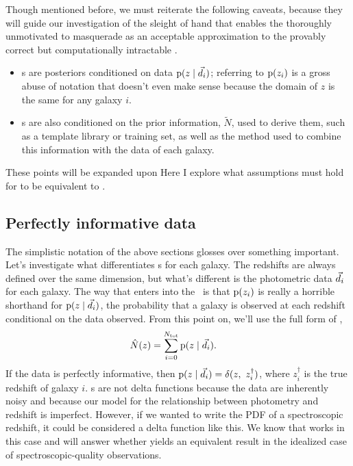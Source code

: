Though mentioned before, we must reiterate the following caveats, because they will guide our investigation of the sleight of hand that enables the thoroughly unmotivated  to masquerade as an acceptable approximation to the provably correct but computationally intractable .
\begin{itemize}
	\item \Pzpdf s are posteriors conditioned on data $\mathrm{p}(z \mid \vec{d}_{i})$; referring to $\mathrm{p}(z_{i})$ is a gross abuse of notation that doesn't even make sense because the domain of $z$ is the same for any galaxy $i$.
	\item \Pzpdf s are also conditioned on the prior information, $\tilde{N}$, used to derive them, such as a template library or training set, as well as the method used to combine this information with the data of each galaxy.
\end{itemize}
These points will be expanded upon Here I explore what assumptions must hold for  to be equivalent to .

\subsection{Perfectly informative data}

The simplistic notation of the above sections glosses over something important.
Let's investigate what differentiates \pzpdf s for each galaxy.
The redshifts are always defined over the same dimension, but what's different is the photometric data $\vec{d}_{i}$ for each galaxy.
The way that enters into the \pzpdf\ is that $\mathrm{p}(z_{i})$ is really a horrible shorthand for $\mathrm{p}(z \mid \vec{d}_{i})$, the probability that a galaxy is observed at each redshift conditional on the data  observed.
From this point on, we'll use the full form of ,
\begin{align}
\eqlabel{eqn:stackwithdata}
\hat{N}(z) &= \sum_{i = 0}^{\ntot} \pr{z \gvn \data_{i}} .
\end{align}
If the data is perfectly informative, then $\pr{z \gvn \data_{i}} = \delta(z,\ z_{i}^{\dagger})$, where $z_{i}^{\dagger}$ is the true redshift of galaxy $i$.
\Pzpdf s are not delta functions because the data are inherently noisy and because our model for the relationship between photometry and redshift is imperfect.
However, if we wanted to write the PDF of a spectroscopic redshift, it could be considered a delta function like this.
We know that  works in this case and will answer whether  yields an equivalent result in the idealized case of spectroscopic-quality observations.

